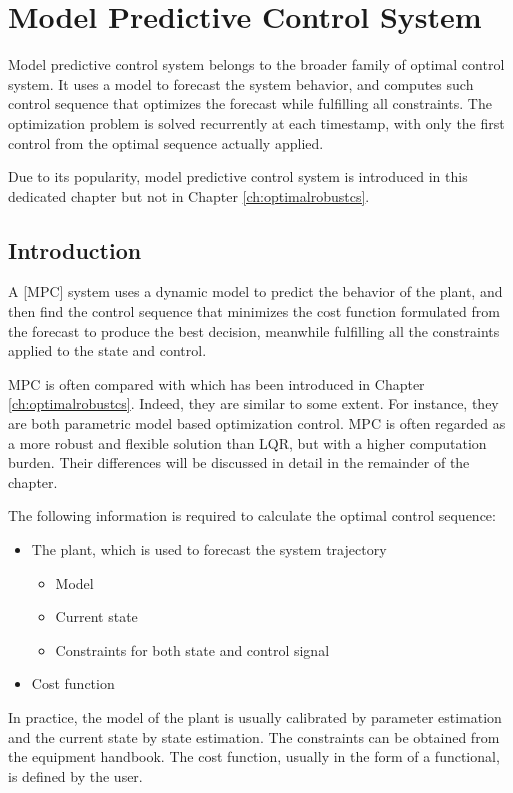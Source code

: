 \chapter{Model Predictive Control System} \label{ch:mpcs}

Model predictive control system belongs to the broader family of optimal control system. It uses a model to forecast the system behavior, and computes such control sequence that optimizes the forecast while fulfilling all constraints. The optimization problem is solved recurrently at each timestamp, with only the first control from the optimal sequence actually applied.

Due to its popularity, model predictive control system is introduced in this dedicated chapter but not in Chapter \ref{ch:optimalrobustcs}.

\section{Introduction}

A [MPC] system uses a dynamic model to predict the behavior of the plant, and then find the control sequence that minimizes the cost function formulated from the forecast to produce the best decision, meanwhile fulfilling all the constraints applied to the state and control.

MPC is often compared with  which has been introduced in Chapter \ref{ch:optimalrobustcs}. Indeed, they are similar to some extent. For instance, they are both parametric model based optimization control. MPC is often regarded as a more robust and flexible solution than LQR, but with a higher computation burden. Their differences will be discussed in detail in the remainder of the chapter. 

The following information is required to calculate the optimal control sequence:
\begin{itemize}
	\item The plant, which is used to forecast the system trajectory
	\begin{itemize}
		\item Model
		\item Current state
		\item Constraints for both state and control signal
	\end{itemize}
	\item Cost function
\end{itemize}
In practice, the model of the plant is usually calibrated by parameter estimation and the current state by state estimation. The constraints can be obtained from the equipment handbook. The cost function, usually in the form of a functional, is defined by the user.

